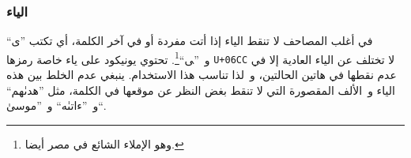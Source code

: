 \documentclass[a4paper]{article}
\renewcommand\U[1]{\colorbox{codecolor}{\texttt{U+#1}}}
\begin{document}
\subsubsection{الياء}
في أغلب المصاحف لا تنقط الياء إذا أتت مفردة أو في آخر الكلمة، أي تكتب
”ی“ و ”‍ی“\footnote{وهو الإملاء الشائع في مصر أيضا.}. تحتوي يونيكود
على ياء خاصة رمزها \U{06CC} لا تختلف عن الياء العادية إلا في عدم
نقطها في هاتين الحالتين، و لذا تناسب هذا الاستخدام. ينبغي عدم الخلط بين
هذه الياء و الألف المقصورة التي لا تنقط بغض النظر عن موقعها في الكلمة،
مثل ”هدىٰهم“ و ”ءاتىٰه“ و ”موسىٰ“.

\end{document}
